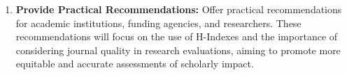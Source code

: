 \begin{enumerate}
      \item \textbf{Provide Practical Recommendations:} Offer practical recommendations for academic institutions,
            funding agencies, and researchers. These recommendations will focus on the use of H-Indexes and the importance of
            considering journal quality in research evaluations, aiming to promote more equitable and accurate assessments of scholarly impact.
\end{enumerate}

